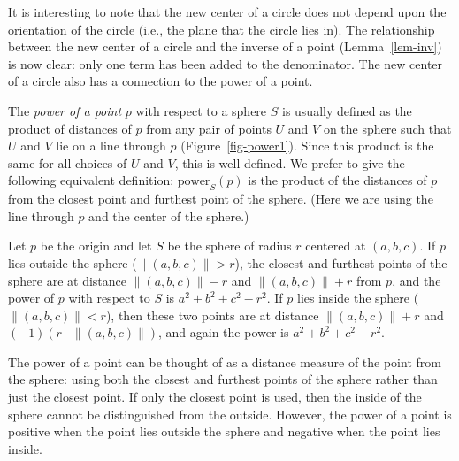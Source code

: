 It is interesting to note that the new center of a circle does not depend 
upon the orientation of the circle (i.e., the plane that the circle lies in).
The relationship between the new center of a circle and the inverse of a point
(Lemma~\ref{lem-inv}) is now clear: 
only one term has been added to the denominator.
The new center of a circle also has a connection to the power of a point.
%
\begin{definition}
The {\em power of a point} $p$ with respect to a sphere $S$ is usually defined
as the product of distances of $p$ from any pair of points $U$ and $V$
on the sphere such that $U$ and $V$ lie on a line through $p$ 
(Figure~\ref{fig-power1}).
Since this product is the same for all choices of $U$ and $V$, 
this is well defined.
%
% 
We prefer to give the following equivalent definition:
$\mbox{power}_{S}(p)$ is the product of the distances of $p$ from the
closest point and furthest point of the sphere.
(Here we are using the line through $p$ and the center of the sphere.)
\end{definition}


\begin{example}
\label{eg:power}
Let $p$ be the origin and let $S$ be the sphere of radius $r$ centered at
$(a,b,c)$.
If $p$ lies outside the sphere ($\| (a,b,c) \| > r$),
the closest and furthest points of the sphere 
are at distance $\|(a,b,c)\| - r$ and $\|(a,b,c)\| + r$ 
from $p$, and the power of $p$ with respect to $S$ is 
$a^{2} + b^{2} + c^{2} - r^{2}$.
If $p$ lies inside the sphere ($\| (a,b,c) \| < r$),
then these two points are at distance $\|(a,b,c)\| + r$ and 
$(-1)(r - \|(a,b,c)\|)$, and again the power is 
$a^{2} + b^{2} + c^{2} - r^{2}$.
\end{example}


The power of a point can be thought of as a distance measure of the point
from the sphere: using both the closest and furthest points of the sphere
rather than just the closest point.
If only the closest point is used, then the inside of the sphere cannot 
be distinguished from the outside.
However, the power of a point is positive when the point lies outside the 
sphere and negative when the point lies inside.

